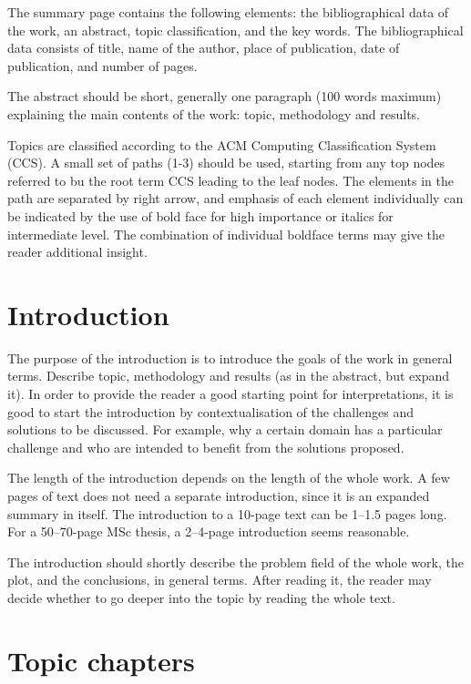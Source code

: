 The summary page contains the following elements: the bibliographical data of the work, an abstract, topic classification, 
and the key words. The bibliographical data consists of title, name of the author, place of publication, date of publication, and number of pages.

The abstract should be short, generally one paragraph (100 words maximum) explaining the main contents of the work: topic, methodology and results.


 Topics are classified according to the ACM Computing Classification System
(CCS). A small set of paths (1-3) should be used, starting from any top nodes
referred to bu the root term CCS leading to the leaf nodes. The elements
in the path are separated by right arrow, and emphasis of each element individually can be indicated
by the use of bold face for high importance or italics for intermediate
level. The combination of individual boldface terms may give the reader
additional insight. 

\section{Introduction}


The purpose of the introduction is to introduce the goals of the work in general terms. Describe topic, 
methodology and results (as in the abstract, but expand it).
In order to provide the reader a good starting point for
interpretations, it is good to start the introduction by
contextualisation of the challenges and solutions to be discussed. For
example, why a certain domain has a particular challenge and who are
intended to benefit from the solutions proposed.

The length of the introduction depends on the length of the whole work. A few pages of text does not need a 
separate introduction, since it is an expanded summary in itself. The introduction to a 10-page text can 
be 1--1.5 pages long. For a 50--70-page MSc thesis, a 2--4-page introduction seems reasonable.

The introduction should shortly describe the problem field of the whole work, the plot, and the conclusions, 
in general terms. After reading it, the reader may decide whether to go deeper into the topic by reading the whole text.


\section{Topic chapters}

